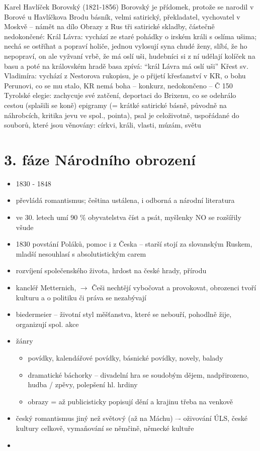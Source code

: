 \documentclass{article}
\begin{document}
Karel Havlíček Borovský (1821-1856)
Borovský je přídomek, protože se narodil v Borové u Havlíčkova Brodu
básník, velmi satirický, překladatel, vychovatel v Moskvě -- námět na dílo Obrazy z Rus
tři satirické skladby, částečně nedokončené:
Král Lávra: vychází ze staré pohádky o irském králi s oslíma ušima; nechá se ostříhat a popraví holiče, jednou vylosují syna chudé ženy, slíbí, že ho nepopraví, on ale vyžvaní vrbě, že má oslí uši, hudebníci si z ní udělají kolíček na basu a poté na královském hradě basa zpívá: “král Lávra má oslí uši”
Křest sv. Vladimíra: vychází z Nestorova rukopisu, je o přijetí křesťanství v KR, o bohu Perunovi, co se mu stalo, KR nemá boha -- konkurz, nedokončeno -- Č 150
Tyrolské elegie: zachycuje své zatčení, deportaci do Brixenu, co se odehrálo cestou (splašili se koně)
epigramy (= krátké satirické básně, původně na náhrobcích, kritika jevu ve spol., pointa), psal je celoživotně, uspořádané do souborů, které jsou věnovány: církvi, králi, vlasti, múzám, světu









\part{3. fáze Národního obrození}
\begin{itemize}
  \item 1830 - 1848
  \item převládá romantismus; čeština ustálena, i odborná a národní literatura
  \item ve 30. letech umí 90 \% obyvatelstva číst a psát, myšlenky NO se rozšířily všude
  \item 1830 povstání Poláků, pomoc i z Česka -- starší stojí za slovanským Ruskem, mladší nesouhlasí s absolutistickým carem
  \item rozvíjení společenského života, hrdost na české hrady, přírodu
  \item kancléř Metternich,  $\rightarrow$ Češi nechtějí vybočovat a provokovat, obrozenci tvoří kulturu a o politiku či práva se nezabývají
  \item biedermeier -- životní styl měšťanstva, které se nebouří, pohodlně žije, organizují spol. akce
  \item žánry
  \begin{itemize}
    \item povídky, kalendářové povídky, básnické povídky, novely, balady
    \item dramatické báchorky -- divadelní hra se soudobým dějem, nadpřirozeno, hudba / zpěvy, polepšení hl. hrdiny
    \item obrazy = až publicisticky popisují dění a krajinu třeba na venkově
  \end{itemize}
  \item český romantismus jiný než světový (až na Máchu) –- oživování ÚLS, české kultury celkově, vymaňování se němčině, německé kultuře
  \item
\end{itemize}
\end{document}
